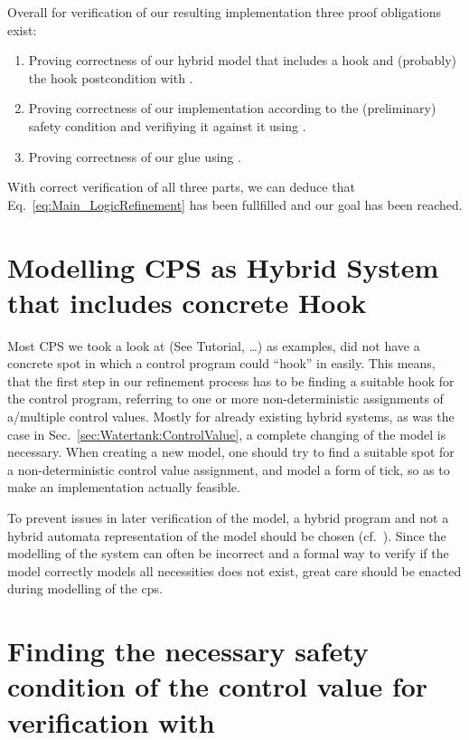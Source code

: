 Overall for verification of our resulting implementation three proof obligations exist:
\begin{enumerate}[label=\roman*]
	\item Proving correctness of our hybrid model that includes a hook and (probably) the hook postcondition with \keym.
	\item Proving correctness of our implementation according to the (preliminary) safety condition and verifiying it against it using \key.
	\item Proving correctness of our glue using \keym.
\end{enumerate} 

With correct verification of all three parts, we can deduce that Eq.~\ref{eq:Main_LogicRefinement} has been fullfilled and our goal has been reached.

\section{Modelling CPS as Hybrid System that includes concrete Hook}
\label{sec:Process:Hook}
Most CPS we took a look at (See \cite{keymaera} Tutorial, \cite[p.~5, p.~11]{platzer2010b} \dots) as examples, did not have a concrete spot in which a control program could ``hook'' in easily. This means, that the first step in our refinement process has to be finding a suitable hook for the control program, referring to one or more non-deterministic assignments of a/multiple control values. Mostly for already existing hybrid systems, as was the case in Sec.~\ref{sec:Watertank:ControlValue}, a complete changing of the model is necessary. When creating a new model, one should try to find a suitable spot for a non-deterministic control value assignment, and model a form of tick, so as to make an implementation actually feasible.

To prevent issues in later verification of the model, a hybrid program and not a hybrid automata representation of the model should be chosen (cf.~\cite[ch.~1.1.4]{platzer2010b}). Since the modelling of the system can often be incorrect and a formal way to verify if the model correctly models all necessities does not exist, great care should be enacted during modelling of the cps.

\section{Finding the necessary safety condition of the control value for verification with \keym}
\label{sec:Process:SafetyCond}

